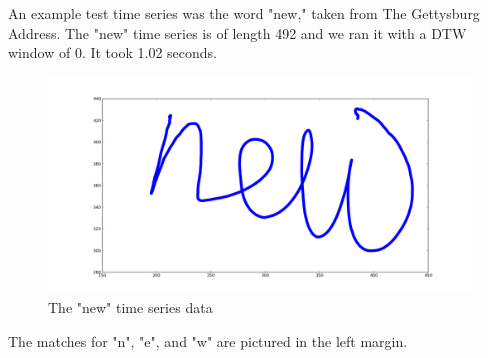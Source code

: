 An example test time series was the word "new," taken from The Gettysburg Address. The "new" time series is of length 492 and we ran it with a DTW window of 0. It took 1.02 seconds.
\\
\begin{figure}
    \includegraphics[width=\columnwidth]{images/new-1.png}
    \caption{The "new" time series data}
    \label{fig:teaser}
\end{figure}

The matches for "n", "e", and "w" are pictured in the left margin.
\\
